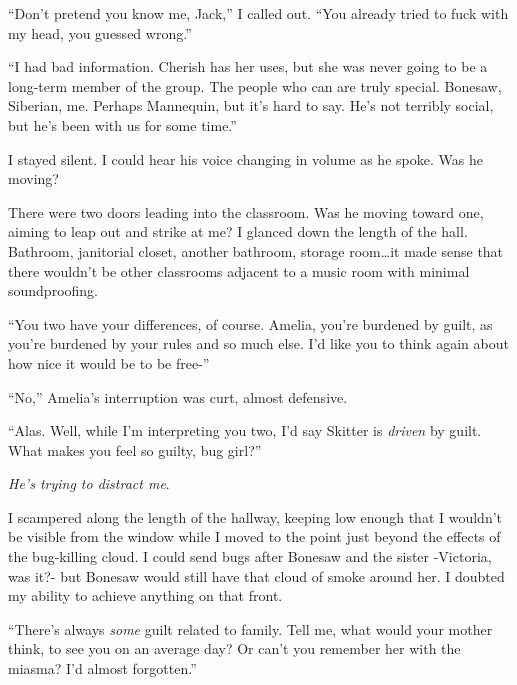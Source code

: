 ``Don't pretend you know me, Jack,'' I called out.  ``You already tried to fuck with my head, you guessed wrong.''



``I had bad information.  Cherish has her uses, but she was never going to be a long-term member of the group.  The people who can are truly special.  Bonesaw, Siberian, me.  Perhaps Mannequin, but it's hard to say.  He's not terribly social, but he's been with us for some time.''



I stayed silent.  I could hear his voice changing in volume as he spoke.  Was he moving?



There were two doors leading into the classroom.  Was he moving toward one, aiming to leap out and strike at me?  I glanced down the length of the hall.  Bathroom, janitorial closet, another bathroom, storage room\ldots it made sense that there wouldn't be other classrooms adjacent to a music room with minimal soundproofing.



``You two have your differences, of course.  Amelia, you're burdened by guilt, as you're burdened by your rules and so much else.  I'd like you to think again about how nice it would be to be free-''



``No,'' Amelia's interruption was curt, almost defensive.



``Alas.  Well, while I'm interpreting you two, I'd say Skitter is \emph{driven} by guilt.  What makes you feel so guilty, bug girl?''



\emph{He's trying to distract me}.



I scampered along the length of the hallway, keeping low enough that I wouldn't be visible from the window while I moved to the point just beyond the effects of the bug-killing cloud.  I could send bugs after Bonesaw and the sister -Victoria, was it?- but Bonesaw would still have that cloud of smoke around her.  I doubted my ability to achieve anything on that front.



``There's always \emph{some} guilt related to family.  Tell me, what would your mother think, to see you on an average day?  Or can't you remember her with the miasma?  I'd almost forgotten.''



